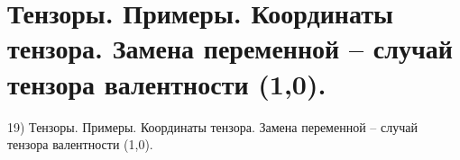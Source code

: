 \section{
 Тензоры. Примеры. Координаты тензора. Замена переменной – случай тензора валентности (1,0).
}

19) Тензоры. Примеры. Координаты тензора. Замена переменной – случай тензора валентности (1,0).
